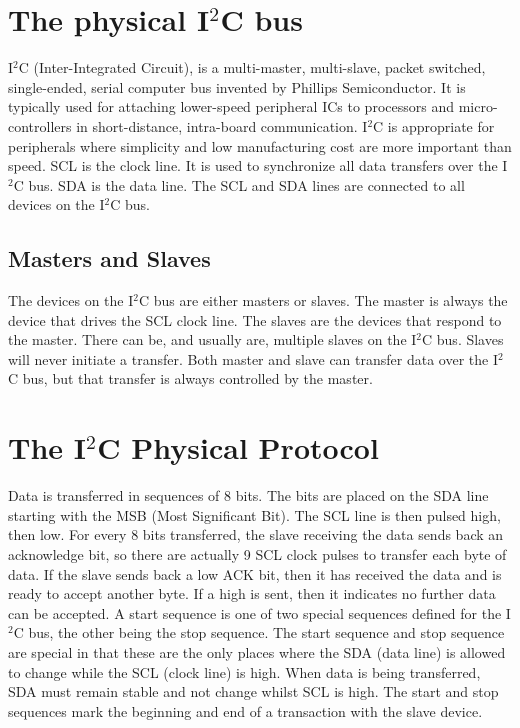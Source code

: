 \documentclass[12pt,twocolumn]{IEEEtran}
\begin{document}
    \section{The physical I$^{2}$C bus}
    I$^{2}$C (Inter-Integrated Circuit),  is a multi-master, multi-slave, packet switched, single-ended, serial computer bus invented by Phillips Semiconductor. It is typically used for attaching lower-speed peripheral ICs to processors and micro-controllers in short-distance, intra-board communication. I$^{2}$C is appropriate for peripherals where simplicity and low manufacturing cost are more important than speed. \newline SCL is the clock line. It is used to synchronize all data transfers over the I$^{2}$C bus. SDA is the data line. The SCL and SDA lines are connected to all devices on the I$^{2}$C bus.

  \subsection{Masters and Slaves}
      The devices on the I$^{2}$C bus are either masters or slaves. The master is always the device that drives the SCL clock line. The slaves are the devices that 
      respond to the master. There can be, and usually are, multiple slaves on the I$^{2}$C bus. Slaves will never initiate a transfer. Both master and slave can transfer 
      data over the I$^{2}$C bus, but that transfer is always controlled by the master.
  
  \section{The I$^{2}$C Physical Protocol}

    Data is transferred in sequences of 8 bits. The bits are placed on the SDA line starting with the MSB (Most Significant Bit). The SCL line is then pulsed high, then low. For every 8 bits transferred, the slave receiving the data sends back an acknowledge bit, so there are actually 9 SCL clock pulses to transfer each byte of data. If the slave sends back a low ACK bit, then it has received the data and is ready to accept another byte. If a high is sent, then it indicates no further data can be accepted. 
    \newline
A start sequence is one of two special sequences defined for the I$^{2}$C bus, the other being the stop sequence. The start sequence and stop sequence are special in that these are the only places where the SDA (data line) is allowed to change while the SCL (clock line) is high. When data is being transferred, SDA must remain stable and not change whilst SCL is high. The start and stop sequences mark the beginning and end of a transaction with the slave device.
\end{document}
